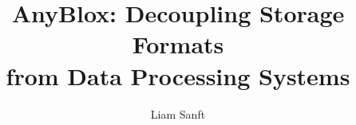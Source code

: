 \documentclass[sigconf,nonacm]{acmart}
\begin{document}
\title{AnyBlox: Decoupling Storage Formats\texorpdfstring{\\}{} from Data Processing Systems}

\author{Liam Sanft}

\renewcommand{\shortauthors}{Sanft}

\begin{abstract}
  
\end{abstract}

\maketitle









\balance


\end{document}
